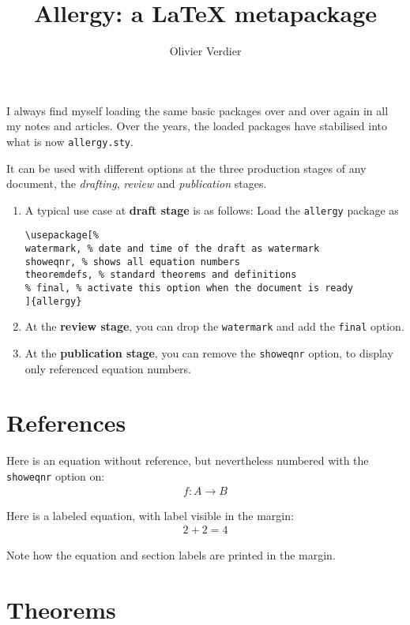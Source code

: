 \documentclass{scrartcl}
\title{Allergy: a \LaTeX{} metapackage}
\author{Olivier Verdier}
\begin{document}
\maketitle

I always find myself loading the same basic packages over and over again in all my notes and articles.
Over the years, the loaded packages have stabilised into what is now \texttt{allergy.sty}.

It can be used with different options at the three production stages of any document, the \emph{drafting}, \emph{review} and \emph{publication} stages.

\begin{enumerate}
  \item
A typical use case at \textbf{draft stage} is as follows:
Load the \texttt{allergy} package as
\begin{lstlisting}
\usepackage[%
watermark, % date and time of the draft as watermark
showeqnr, % shows all equation numbers
theoremdefs, % standard theorems and definitions
% final, % activate this option when the document is ready
]{allergy}
\end{lstlisting}
\item
At the \textbf{review stage}, you can drop the \lstinline|watermark| and add the \lstinline|final| option.
\item
At the \textbf{publication stage}, you can remove the \lstinline|showeqnr| option, to display only referenced equation numbers.
\end{enumerate}

\section{References}
\label{sec:references}

Here is an equation without reference, but nevertheless numbered with the \lstinline|showeqnr| option on:
\begin{align}
f \colon A \to B
\end{align}

Here is a labeled equation, with label visible in the margin:
\begin{align}
\label{eq:important}
2 + 2 = 4
\end{align}

Note how the equation and section labels are printed in the margin.

\section{Theorems}
\end{document}
